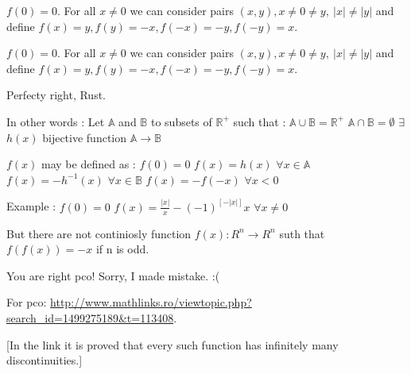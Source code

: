 \begin{mysolution}
	$ f(0) = 0$. For all $ x\not = 0$ we can consider pairs $ (x,y), x\not = 0\not = y,\ |x|\not = |y|$ and define
$ f(x) = y,f(y) =-x,f(-x) =-y, f(-y) = x$.
\end{mysolution}



\begin{mysolution}
	\begin{tcolorbox}$ f(0) = 0$. For all $ x\not = 0$ we can consider pairs $ (x,y), x\not = 0\not = y,\ |x|\not = |y|$ and define
$ f(x) = y,f(y) =-x,f(-x) =-y, f(-y) = x$.\end{tcolorbox}

Perfecty right, Rust.

In other words :
Let $ \mathbb{A}$ and $ \mathbb{B}$ to subsets of $ \mathbb{R}^{+}$ such that :
$ \mathbb{A}\cup\mathbb{B}=\mathbb{R}^{+}$
$ \mathbb{A}\cap\mathbb{B}=\emptyset$
$ \exists$ $ h(x)$ bijective function $ \mathbb{A}\rightarrow\mathbb{B}$

$ f(x)$ may be defined as :
$ f(0)=0$
$ f(x)=h(x)$ $ \forall x\in\mathbb{A}$
$ f(x)=-h^{-1}(x)$ $ \forall x\in\mathbb{B}$
$ f(x)=-f(-x)$ $ \forall x<0$

Example :
$ f(0)=0$
$ f(x)=\frac{|x|}{x}-(-1)^{[-|x|]}x$ $ \forall x\neq 0$
\end{mysolution}



\begin{mysolution}
	But there are not continiosly function $ f(x): R^{n}\to R^{n}$ suth that $ f(f(x))=-x$ if n is odd.
\end{mysolution}



\begin{mysolution}
	You are right pco! Sorry, I made mistake. :(
\end{mysolution}



\begin{mysolution}
	For pco: \url{http://www.mathlinks.ro/viewtopic.php?search_id=1499275189&t=113408}.

[In the link it is proved that every such function has infinitely many discontinuities.]
\end{mysolution}



